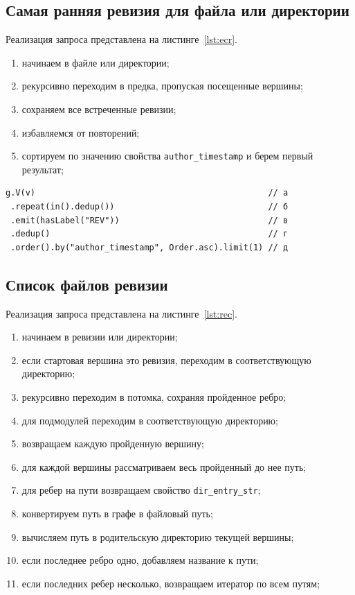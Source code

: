 \documentclass[times,specification,annotation]{itmo-student-thesis}
\begin{document}
\subsection{Самая ранняя ревизия для файла или директории}

Реализация запроса представлена на листинге~\ref{lst:ecr}.
\begin{enumerate}
    \item начинаем в файле или директории;
    \item рекурсивно переходим в предка, пропуская посещенные вершины;
    \item сохраняем все встреченные ревизии;
    \item избавляемся от повторений;
    \item сортируем по значению свойства \texttt{author\_timestamp} и берем первый результат;
\end{enumerate}

\begin{lstlisting}[float=!h,caption={Самая ранняя ревизия для файла или директории на Gremlin},label={lst:ecr}]
g.V(v)                                               // а
 .repeat(in().dedup())                               // б
 .emit(hasLabel("REV"))                              // в
 .dedup()                                            // г
 .order().by("author_timestamp", Order.asc).limit(1) // д
\end{lstlisting}

\subsection{Список файлов ревизии}

Реализация запроса представлена на листинге~\ref{lst:rec}.
\begin{enumerate}
    \item начинаем в ревизии или директории;
    \item если стартовая вершина это ревизия, переходим в соответствующую директорию;
    \item рекурсивно переходим в потомка, сохраняя пройденное ребро;
    \item для подмодулей переходим в соответствующую директорию;
    \item возвращаем каждую пройденную вершину;
    \item для каждой вершины рассматриваем весь пройденный до нее путь;
    \item для ребер на пути возвращаем свойство \texttt{dir\_entry\_str};
    \item конвертируем путь в графе в файловый путь;
    \item вычисляем путь в родительскую директорию текущей вершины;
    \item если последнее ребро одно, добавляем название к пути;
    \item если последних ребер несколько, возвращаем итератор по всем путям;
\end{enumerate}
\end{document}
